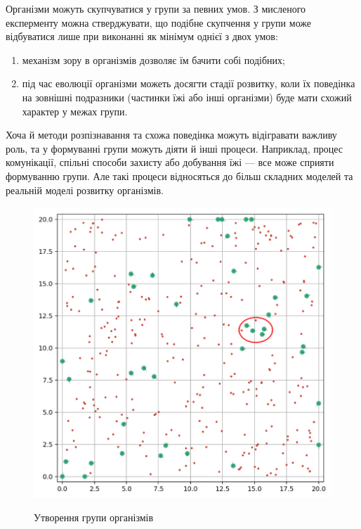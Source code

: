 

Організми можуть скупчуватися у групи за певних умов.
З мисленого експерменту можна стверджувати, що подібне
скупчення у групи може відбуватися лише при виконанні
як мінімум однієї з двох умов:
\begin{enumerate}
  \item механізм зору в організмів дозволяє їм бачити
    собі подібних;
  \item під час еволюції організми можеть досягти стадії розвитку,
    коли їх поведінка на зовнішні подразники (частинки їжі або інші організми)
    буде мати схожий характер у межах групи.
\end{enumerate}

Хоча й методи розпізнавання та схожа поведінка можуть відігравати важливу роль,
та у формуванні групи можуть діяти й інші процеси.
Наприклад, процес комунікації, спільні способи захисту або добування їжі ---
все може сприяти формуванню групи.
Але такі процеси відносяться до більш складних моделей та реальній моделі
розвитку організмів.

\begin{figure}[ht]
  \centering
  \caption{Утворення групи організмів}
  \includegraphics[scale=0.5]{Images/organisms-group-of-4.png}
  \label{fig:утворення-групи-організмів}
\end{figure}

